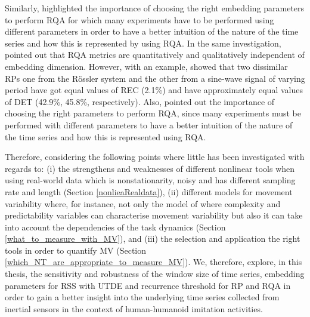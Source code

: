 Similarly, \cite{iwanski1998} highlighted the importance of choosing 
the right embedding parameters to perform RQA for which many experiments 
have to be performed using different parameters in order to have a better 
intuition of the nature of the time series and how this is represented 
by using RQA. In the same investigation, \cite{iwanski1998} pointed out 
that RQA metrics are quantitatively and qualitatively independent of 
embedding dimension. However, with an example, \cite{iwanski1998} 
showed that two dissimilar RPs one from the R\"{o}ssler system and 
the other from a sine-wave signal of varying period have got equal 
values of REC (2.1\%) and have approximately equal values of 
DET (42.9\%, 45.8\%, respectively).
Also, \cite{iwanski1998} pointed out the importance of choosing the 
right parameters to perform RQA, since many experiments must be performed 
with different parameters to have a better intuition of the nature 
of the time series and how this is represented using RQA.


Therefore, considering the following points where little has been 
investigated with regards to: 
(i) the strengthens and weaknesses of different nonlinear tools when 
using real-world data which is nonstationarity, noisy and has different 
sampling rate and length (Section \ref{nonlieaRealdata}),
(ii) different models for movement variability where, for instance, 
not only the model of \cite{stergiou2006} where complexity and 
predictability variables can characterise movement 
variability but also it can take into account the dependencies of the 
task dynamics \citep{vaillancourt2002, vaillancourt2003} (Section 
\ref{what_to_measure_with_MV}), and 
(iii) the selection and application the right tools in order to quantify MV
(Section \ref{which_NT_are_appropriate_to_measure_MV}).
We, therefore, explore, in this thesis, the sensitivity and robustness of 
the window size of time series, embedding parameters for RSS with UTDE 
and recurrence threshold for RP and RQA in order to gain a 
better insight into the underlying time series collected from inertial 
sensors in the context of human-humanoid imitation activities.




